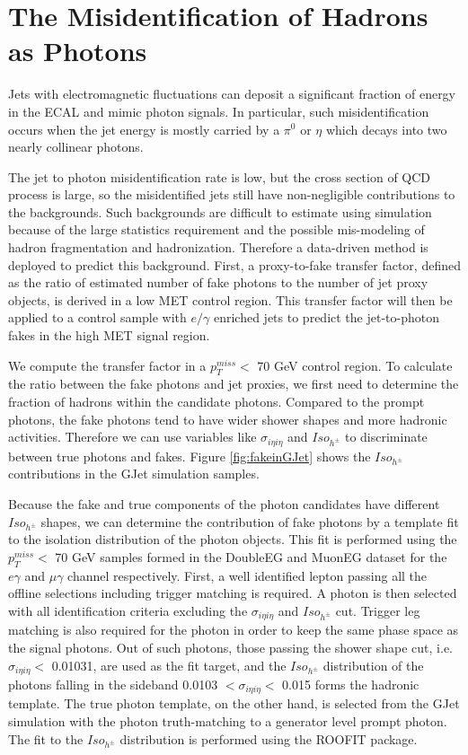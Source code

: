 \documentclass[thesis.tex]{subfiles}
\renewcommand\_{\textunderscore\allowbreak}
\begin{document}
\section{The Misidentification of Hadrons as Photons}\label{subsec:jetfakepho}
Jets with electromagnetic fluctuations can deposit a significant fraction of energy in the ECAL and mimic photon signals. In particular, such misidentification occurs when the jet energy is mostly carried by a $\pi^0$ or $\eta$ which decays into two nearly collinear photons. 

The jet to photon misidentification rate is low, but the cross section of QCD process is large, so the misidentified jets still have non-negligible contributions to the backgrounds. Such backgrounds are difficult to estimate using simulation because of the large statistics requirement and the possible mis-modeling of hadron fragmentation and hadronization. Therefore a data-driven method is deployed to predict this background. First, a proxy-to-fake transfer factor, defined as the ratio of estimated number of fake photons to the number of jet proxy objects, is derived in a low MET control region. This transfer factor will then be applied to a control sample with $e/\gamma$ enriched jets to predict the jet-to-photon fakes in the high MET signal region. 

We compute the transfer factor in a $p_T^{miss} < $ 70 GeV control region. To calculate the ratio between the fake photons and jet proxies, we first need to determine the fraction of hadrons within the candidate photons.  Compared to the prompt photons, the fake photons tend to have wider shower shapes and more hadronic activities. Therefore we can use variables like $\sigma_{i\eta i\eta}$ and $Iso_{h^\pm}$ to discriminate between true photons and fakes. Figure \ref{fig:fakeinGJet} shows the $Iso_{h^\pm}$ contributions in the GJet simulation samples. 

Because the fake and true components of the photon candidates have different $Iso_{h^\pm}$ shapes, we can determine the contribution of fake photons by a template fit to the isolation distribution of the photon objects. This fit is performed using the $p_T^{miss} <$ 70 GeV samples formed in the DoubleEG and MuonEG dataset for the $e\gamma$ and $\mu\gamma$ channel respectively. First, a well identified lepton passing all the offline selections including trigger matching is required. A photon is then selected with all identification criteria excluding the $\sigma_{i\eta i\eta}$ and $Iso_{h^\pm}$ cut. Trigger leg matching is also required for the photon in order to keep the same phase space as the signal photons. Out of such photons, those passing the shower shape cut, i.e. $\sigma_{i\eta i\eta} <$ 0.01031, are used as the fit target, and the $Iso_{h^\pm}$ distribution of the photons falling in the sideband 0.0103 $< \sigma_{i\eta i\eta} <$ 0.015 forms the hadronic template. The true photon template, on the other hand, is selected from the GJet simulation with the photon truth-matching to a generator level prompt photon. The fit to the $Iso_{h^\pm}$ distribution is performed using the ROOFIT package. 
\end{document}
